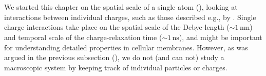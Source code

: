 

\section{}
\label{sec:Basics:scale_jump1}
We started this chapter on the spatial scale of a single atom (), looking at interactions between individual charges, such as those described e.g., by . Single charge interactions take place on the spatial scale of the Debye-length ($\sim 1 \, \si{\nano\metre}$) and temporal scale of the charge-relaxation time ($\sim 1 \, \si{\nano\second}$), and might be important for understanding detailed properties in cellular membranes. However, as was argued in the previous subsection (), we do not (and can not) study a macroscopic system by keeping track of individual particles or charges.

